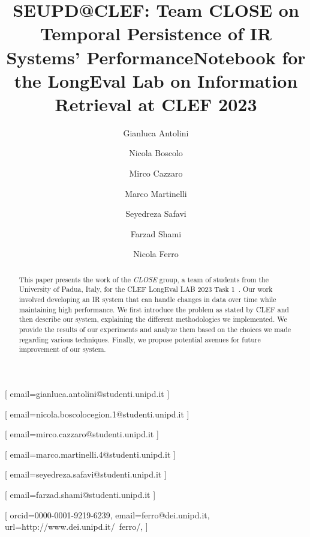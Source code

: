 \documentclass{ceurart}
\begin{document}


\title{SEUPD@CLEF: Team CLOSE on Temporal Persistence of IR Systems' Performance}
\title[mode=sub]{Notebook for the LongEval Lab on Information Retrieval at CLEF 2023}

\author[1]{Gianluca Antolini}[%
email=gianluca.antolini@studenti.unipd.it
]

\author[1]{Nicola Boscolo}[%
email=nicola.boscolocegion.1@studenti.unipd.it
]

\author[1]{Mirco Cazzaro}[%
email=mirco.cazzaro@studenti.unipd.it
]

\author[1]{Marco Martinelli}[%
email=marco.martinelli.4@studenti.unipd.it
]

\author[1]{Seyedreza Safavi}[%
email=seyedreza.safavi@studenti.unipd.it
]

\author[1]{Farzad Shami}[%
email=farzad.shami@studenti.unipd.it
]

\author[1]{Nicola Ferro}[%
  orcid=0000-0001-9219-6239,
  email=ferro@dei.unipd.it,
  url=http://www.dei.unipd.it/~ferro/,
]

\address[1]{University of Padua, Italy}


\begin{abstract}
  This paper presents the work of the \textit{CLOSE} group, a team of students from the University of Padua, Italy, for the \ac{CLEF} LongEval LAB 2023 Task 1~\cite{cleflongeval}.
  Our work involved developing an \ac{IR} system that can handle changes in data over time while maintaining high performance.
  We first introduce the problem as stated by \ac{CLEF} and then describe our system, explaining the different methodologies we implemented.
  We provide the results of our experiments and analyze them based on the choices we made regarding various techniques.
  Finally, we propose potential avenues for future improvement of our system.
\end{abstract}
\end{document}
